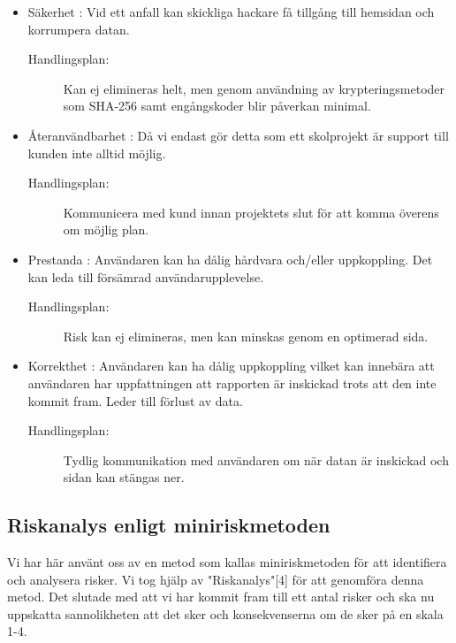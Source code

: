 \documentclass[12pt]{article}
\begin{document}
\begin{itemize}
    \item Säkerhet : Vid ett anfall kan skickliga hackare få tillgång till hemsidan och korrumpera datan.
    \begin{description}
          \item[Handlingsplan:] Kan ej elimineras helt, men genom användning av krypteringsmetoder som SHA-256 samt engångskoder blir påverkan minimal.
    \end{description}
    \item Återanvändbarhet : Då vi endast gör detta som ett skolprojekt är support till kunden inte alltid möjlig.
    \begin{description}
          \item[Handlingsplan:] Kommunicera med kund innan projektets slut för att komma överens om möjlig plan.
    \end{description}
    \item Prestanda : Användaren kan ha dålig hårdvara och/eller uppkoppling. Det kan leda till försämrad användarupplevelse.
    \begin{description}
          \item[Handlingsplan:] Risk kan ej elimineras, men kan minskas genom en optimerad sida.
    \end{description}
    \item Korrekthet : Användaren kan ha dålig uppkoppling vilket kan innebära att användaren har uppfattningen att rapporten är inskickad trots att den inte kommit fram. Leder till förlust av data.
    \begin{description}
          \item[Handlingsplan:] Tydlig kommunikation med användaren om när datan är inskickad och sidan kan stängas ner.
    \end{description}
\end{itemize}

\subsection{Riskanalys enligt miniriskmetoden}
Vi har här använt oss av en metod som kallas miniriskmetoden för att identifiera och analysera risker. Vi tog hjälp av "Riskanalys"[4] för att genomföra denna metod. Det slutade med att vi har kommit fram till ett antal risker och ska nu uppskatta sannolikheten att det sker och konsekvenserna om de sker på en skala 1-4. 
\\
\end{document}
